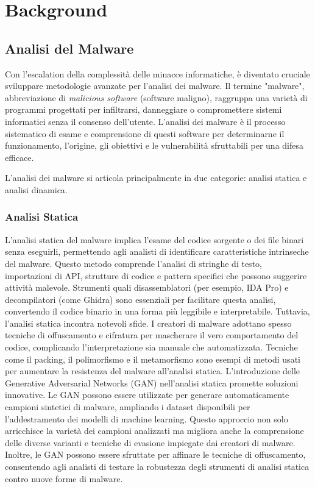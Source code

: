 \chapter{Background}
\label{cap:background}

\section{Analisi del Malware}
Con l'escalation della complessità delle minacce informatiche, è diventato cruciale sviluppare metodologie avanzate per l'analisi dei malware. Il termine "malware", abbreviazione di \emph{malicious software} (software maligno), raggruppa una varietà di programmi progettati per infiltrarsi, danneggiare o compromettere sistemi informatici senza il consenso dell'utente. L'analisi dei malware è il processo sistematico di esame e comprensione di questi software per determinarne il funzionamento, l'origine, gli obiettivi e le vulnerabilità sfruttabili per una difesa efficace.

L'analisi dei malware si articola principalmente in due categorie: analisi statica e analisi dinamica.

\subsection{Analisi Statica}
L'analisi statica del malware implica l'esame del codice sorgente o dei file binari senza eseguirli, permettendo agli analisti di identificare caratteristiche intrinseche del malware. Questo metodo comprende l'analisi di stringhe di testo, importazioni di API, strutture di codice e pattern specifici che possono suggerire attività malevole. Strumenti quali disassemblatori (per esempio, IDA Pro) e decompilatori (come Ghidra) sono essenziali per facilitare questa analisi, convertendo il codice binario in una forma più leggibile e interpretabile.
Tuttavia, l'analisi statica incontra notevoli sfide. I creatori di malware adottano spesso tecniche di offuscamento e cifratura per mascherare il vero comportamento del codice, complicando l'interpretazione sia manuale che automatizzata. Tecniche come il packing, il polimorfismo e il metamorfismo sono esempi di metodi usati per aumentare la resistenza del malware all'analisi statica.
L'introduzione delle Generative Adversarial Networks (GAN) nell'analisi statica promette soluzioni innovative. Le GAN possono essere utilizzate per generare automaticamente campioni sintetici di malware, ampliando i dataset disponibili per l'addestramento dei modelli di machine learning. Questo approccio non solo arricchisce la varietà dei campioni analizzati ma migliora anche la comprensione delle diverse varianti e tecniche di evasione impiegate dai creatori di malware. Inoltre, le GAN possono essere sfruttate per affinare le tecniche di offuscamento, consentendo agli analisti di testare la robustezza degli strumenti di analisi statica contro nuove forme di malware.


